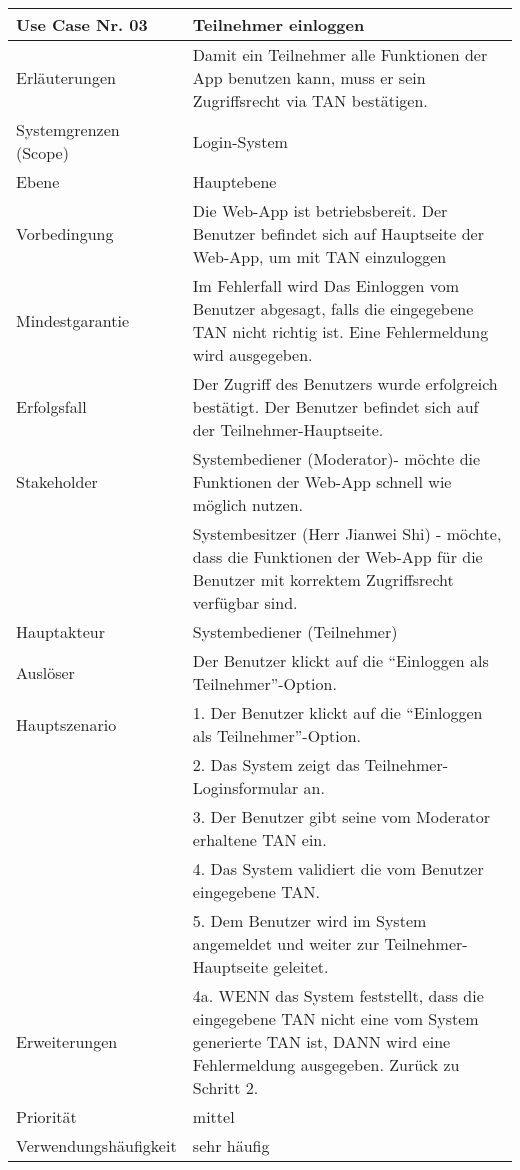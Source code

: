 \begin{tabularx}{\linewidth}{|l|X|}
	\hline
	Use Case Nr. 03			& \textbf{Teilnehmer einloggen} \\ \hline
	Erläuterungen			& Damit ein Teilnehmer alle Funktionen der App benutzen kann, 
							  muss er sein Zugriffsrecht via TAN bestätigen. \\ \hline
	Systemgrenzen (Scope)	& Login-System \\ \hline
	Ebene					& Hauptebene \\ \hline
	Vorbedingung			& Die Web-App ist betriebsbereit. Der Benutzer befindet sich auf
							  Hauptseite der Web-App, um mit TAN einzuloggen \\ \hline
	Mindestgarantie			& Im Fehlerfall wird Das Einloggen vom Benutzer abgesagt, falls die 
							  eingegebene TAN nicht richtig ist. Eine Fehlermeldung wird 
							  ausgegeben. \\ \hline
	Erfolgsfall 			& Der Zugriff des Benutzers wurde erfolgreich bestätigt. Der
							  Benutzer befindet sich auf der Teilnehmer-Hauptseite. \\ \hline
	Stakeholder				& Systembediener (Moderator)- möchte die Funktionen der Web-App 
							  schnell wie möglich nutzen. \\
							& Systembesitzer (Herr Jianwei Shi) - möchte, dass die Funktionen   
							  der Web-App für die Benutzer mit korrektem Zugriffsrecht verfügbar sind.\\ \hline
	Hauptakteur				& Systembediener (Teilnehmer) \\ \hline
	Auslöser				& Der Benutzer klickt auf die ``Einloggen als Teilnehmer''-Option.
							  \\ \hline
	Hauptszenario			& 1. Der Benutzer klickt auf die ``Einloggen als Teilnehmer''-Option.
							  \\
	                        & 2. Das System zeigt das Teilnehmer-Loginsformular an. \\
							& 3. Der Benutzer gibt seine vom Moderator erhaltene TAN ein. \\
							& 4. Das System validiert die vom Benutzer eingegebene
							  TAN. \\
							& 5. Dem Benutzer wird im System angemeldet und weiter zur
							  Teilnehmer-Hauptseite geleitet. \\ \hline
	Erweiterungen			& 4a. WENN das System feststellt, dass die eingegebene TAN nicht 
							  eine vom System generierte TAN ist, DANN wird eine Fehlermeldung 
							  ausgegeben. Zurück zu Schritt 2. \\ \hline
	Priorität				& mittel \\ \hline
	Verwendungshäufigkeit	& sehr häufig \\ \hline
\end{tabularx}

